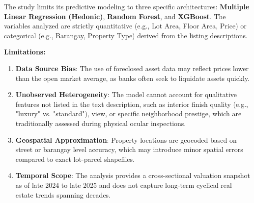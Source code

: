 The study limits its predictive modeling to three specific architectures: \textbf{Multiple Linear Regression (Hedonic)}, \textbf{Random Forest}, and \textbf{XGBoost}. The variables analyzed are strictly quantitative (e.g., Lot Area, Floor Area, Price) or categorical (e.g., Barangay, Property Type) derived from the listing descriptions.

\textbf{Limitations:}
\begin{enumerate}
    \item \textbf{Data Source Bias}: The use of foreclosed asset data may reflect prices lower than the open market average, as banks often seek to liquidate assets quickly.
    \item \textbf{Unobserved Heterogeneity}: The model cannot account for qualitative features not listed in the text description, such as interior finish quality (e.g., "luxury" vs. "standard"), view, or specific neighborhood prestige, which are traditionally assessed during physical ocular inspections.
    \item \textbf{Geospatial Approximation}: Property locations are geocoded based on street or barangay level accuracy, which may introduce minor spatial errors compared to exact lot-parcel shapefiles.
    \item \textbf{Temporal Scope}: The analysis provides a cross-sectional valuation snapshot as of late 2024 to late 2025 and does not capture long-term cyclical real estate trends spanning decades.
\end{enumerate}

